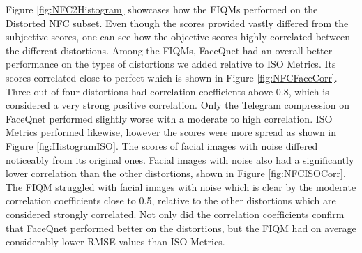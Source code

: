 Figure \ref{fig:NFC2Histogram} showcases how the FIQMs performed on the Distorted NFC subset. Even though the scores provided vastly differed from the subjective scores, one can see how the objective scores highly correlated between the different distortions. Among the FIQMs, FaceQnet had an overall better performance on the types of distortions we added relative to ISO Metrics. Its scores correlated close to perfect which is shown in Figure \ref{fig:NFCFaceCorr}. Three out of four distortions had correlation coefficients above 0.8, which is considered a very strong positive correlation. Only the Telegram compression on FaceQnet performed slightly worse with a moderate to high correlation. ISO Metrics performed likewise, however the scores were more spread as shown in Figure \ref{fig:HistogramISO}. The scores of facial images with noise differed noticeably from its original ones. Facial images with noise also had a significantly lower correlation than the other distortions, shown in Figure \ref{fig:NFCISOCorr}. The FIQM struggled with facial images with noise which is clear by the moderate correlation coefficients close to 0.5, relative to the other distortions which are considered strongly correlated. Not only did the correlation coefficients confirm that FaceQnet performed better on the distortions, but the FIQM had on average considerably lower RMSE values than ISO Metrics. 


